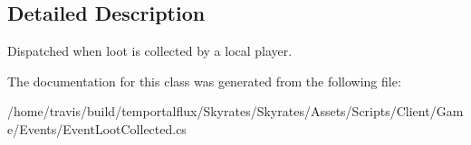 \subsection{Detailed Description}
Dispatched when loot is collected by a local player. 



The documentation for this class was generated from the following file\-:\begin{DoxyCompactItemize}
\item 
/home/travis/build/temportalflux/\-Skyrates/\-Skyrates/\-Assets/\-Scripts/\-Client/\-Game/\-Events/Event\-Loot\-Collected.\-cs\end{DoxyCompactItemize}
